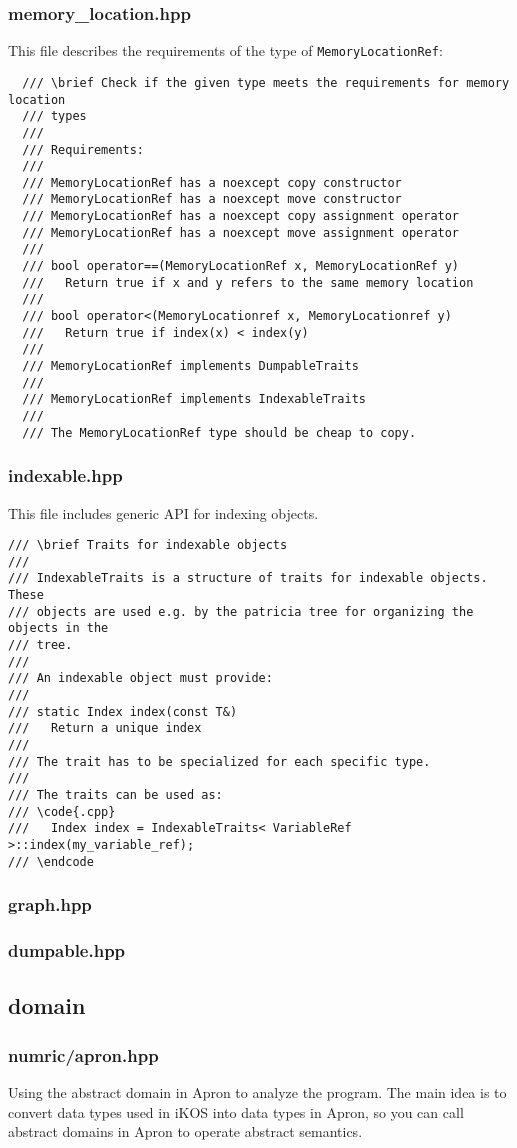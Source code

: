 \documentclass[12pt]{article}
\begin{document}
\subsubsection{memory\_location.hpp}
This file describes the requirements of the type of \texttt{MemoryLocationRef}:
\begin{lstlisting}
  /// \brief Check if the given type meets the requirements for memory location
  /// types
  ///
  /// Requirements:
  ///
  /// MemoryLocationRef has a noexcept copy constructor
  /// MemoryLocationRef has a noexcept move constructor
  /// MemoryLocationRef has a noexcept copy assignment operator
  /// MemoryLocationRef has a noexcept move assignment operator
  ///
  /// bool operator==(MemoryLocationRef x, MemoryLocationRef y)
  ///   Return true if x and y refers to the same memory location
  ///
  /// bool operator<(MemoryLocationref x, MemoryLocationref y)
  ///   Return true if index(x) < index(y)
  ///
  /// MemoryLocationRef implements DumpableTraits
  ///
  /// MemoryLocationRef implements IndexableTraits
  ///
  /// The MemoryLocationRef type should be cheap to copy.
\end{lstlisting}

\subsubsection{indexable.hpp}
This file includes generic API for indexing objects.
\begin{lstlisting}
/// \brief Traits for indexable objects
///
/// IndexableTraits is a structure of traits for indexable objects. These
/// objects are used e.g. by the patricia tree for organizing the objects in the
/// tree.
///
/// An indexable object must provide:
///
/// static Index index(const T&)
///   Return a unique index
///
/// The trait has to be specialized for each specific type.
///
/// The traits can be used as:
/// \code{.cpp}
///   Index index = IndexableTraits< VariableRef >::index(my_variable_ref);
/// \endcode
\end{lstlisting}

\subsubsection{graph.hpp}

\subsubsection{dumpable.hpp}

\subsection{domain}
\subsubsection{numric/apron.hpp}
Using the abstract domain in Apron to analyze the program. The main idea is to convert data types used in iKOS into data types in Apron, so you can call abstract domains in Apron to operate abstract semantics.
\end{document}
